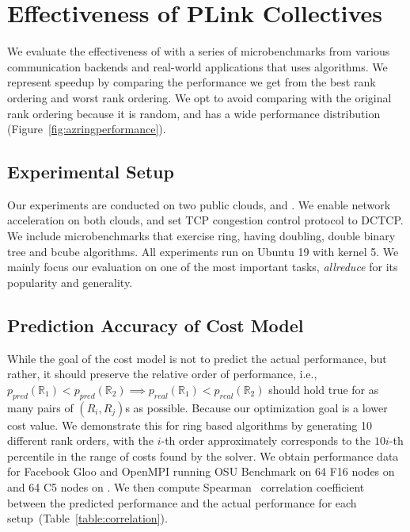 
\section{Effectiveness of PLink Collectives}
We evaluate the effectiveness of \cmpi with a series of microbenchmarks from various communication backends and real-world applications that uses \collectives algorithms. We represent speedup by comparing the performance we get from the best rank ordering and worst rank ordering. We opt to avoid comparing with the original rank ordering because it is random, and has a wide performance distribution (Figure~\ref{fig:azringperformance}).

\subsection{Experimental Setup}
Our experiments are conducted on two public clouds, \azure and \ectwo. We enable network acceleration on both clouds, and set TCP congestion control protocol to DCTCP. We include microbenchmarks that exercise ring, having doubling, double binary tree and bcube algorithms.  All experiments run on Ubuntu 19 with kernel 5. We mainly focus our evaluation on one of the most important \collectives tasks, \textit{allreduce} for its popularity and generality. %

\subsection{Prediction Accuracy of Cost Model}
While the goal of the cost model is not to predict the actual performance, but rather, it should preserve the relative order of performance, i.e., $p_{pred}(\mathbb{R}_1) < p_{pred}(\mathbb{R}_2) \implies p_{real}(\mathbb{R}_1) < p_{real}(\mathbb{R}_2)$ should hold true for as many pairs of $(R_i, R_j)$s as possible. Because our optimization goal is a lower cost value. We demonstrate this for ring based \mpi algorithms by generating 10 different rank orders, with the $i$-th order approximately corresponds to the $10i$-th percentile in the range of costs found by the solver. We obtain performance data for Facebook Gloo and OpenMPI running OSU Benchmark on 64 F16 nodes on \azure and 64 C5 nodes on \ectwo. We then compute Spearman~\cite{spearman} correlation coefficient between the predicted performance and the actual performance for each setup~(Table~\ref{table:correlation}). 

